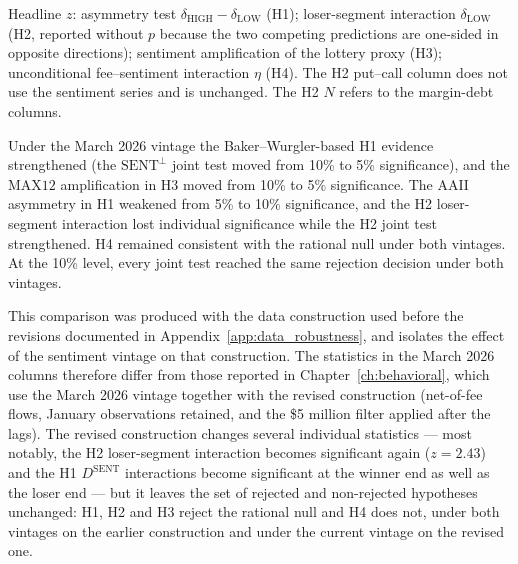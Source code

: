 \documentclass[12pt, oneside]{report}
\renewcommand{\mathrm}[1]{\text{#1}}%
\newlength{\tabletempwidth}
\newcommand{\tablefont}{\fontsize{9}{11}\selectfont}  %
\begin{document}
\begin{table}[!htbp]
\begin{minipage}{\tabletempwidth}
\captionsetup{width=\linewidth}
\caption{Primary-Specification Test Statistics Under the Previous and Current Sentiment Vintages (Previous Data Construction)}\label{tab:sent_vintage}
\ifdim\wd\tabletempbox>\linewidth
  \resizebox{\linewidth}{!}{\usebox{\tabletempbox}}
\else
  \usebox{\tabletempbox}
\fi
\par\medskip
\begin{singlespace}\tablefont\noindent
Headline $z$: asymmetry test $\delta_{\text{HIGH}} - \delta_{\text{LOW}}$ (H1); loser-segment interaction $\delta_{\text{LOW}}$ (H2, reported without $p$ because the two competing predictions are one-sided in opposite directions); sentiment amplification of the lottery proxy (H3); unconditional fee--sentiment interaction $\eta$ (H4). The H2 put--call column does not use the sentiment series and is unchanged. The H2 $N$ refers to the margin-debt columns.
\end{singlespace}
\end{minipage}
\end{table}

\noindent Under the March 2026 vintage the Baker--Wurgler-based H1
evidence strengthened (the $\mathrm{SENT}^{\perp}$ joint test moved from
10\% to 5\% significance), and the $\text{MAX12}$ amplification in H3
moved from 10\% to 5\% significance. The AAII asymmetry in H1 weakened
from 5\% to 10\% significance, and the H2 loser-segment interaction lost
individual significance while the H2 joint test strengthened. H4 remained
consistent with the rational null under both vintages. At the 10\% level,
every joint test reached the same rejection decision under both
vintages.

This comparison was produced with the data construction used before the
revisions documented in Appendix~\ref{app:data_robustness}, and isolates the effect of the
sentiment vintage on that construction. The statistics in the March 2026
columns therefore differ from those reported in
Chapter~\ref{ch:behavioral}, which use the March 2026 vintage together
with the revised construction (net-of-fee flows, January observations
retained, and the \$5 million filter applied after the lags). The
revised construction changes several individual statistics --- most
notably, the H2 loser-segment interaction becomes significant again
($z = 2.43$) and the H1 $D^{\text{SENT}}$ interactions become significant at
the winner end as well as the loser end --- but it leaves the set of
rejected and non-rejected hypotheses unchanged: H1, H2 and H3 reject the
rational null and H4 does not, under both vintages on the earlier
construction and under the current vintage on the revised one.
\end{document}
